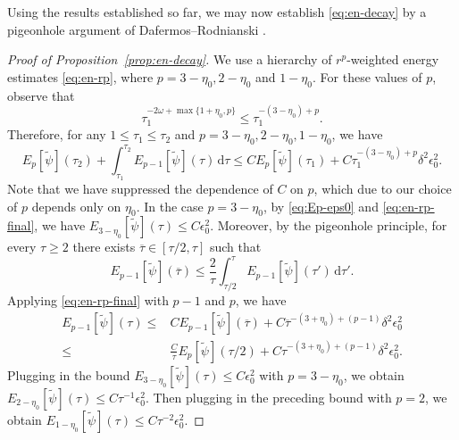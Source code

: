 \documentclass[10pt, reqno]{amsart}
\theoremstyle{definition}
\theoremstyle{remark}
\theoremstyle{conjecture}
\numberwithin{equation}{section}
\newcommand{\set}[1]{\{#1\}}
\newcommand{\ud}{\mathrm{d}}
\newcommand{\0}{\emptyset}
\newcommand{\dlt}{\delta}
\newcommand{\eps}{\epsilon}
\newcommand{\omg}{\omega}
\newcommand{\psibg}{\overline{\psi}}				%
\newcommand{\psidf}{\widetilde{\psi}}				%
\begin{document}
Using the results established so far, we may now establish \eqref{eq:en-decay} by a pigeonhole argument of Dafermos--Rodnianski \cite{DRNM}.
\begin{proof}[Proof of Proposition~\ref{prop:en-decay}]
We use a hierarchy of $r^{p}$-weighted energy estimates \eqref{eq:en-rp}, where $p = 3-\eta_{0}, 2-\eta_{0}$ and $1-\eta_{0}$. For these values of $p$, observe that
\begin{equation*}
	\tau_{1}^{-2 \omg + \max \set{1+\eta_{0}, p}} \leq \tau_{1}^{-(3 - \eta_{0}) + p}.
\end{equation*}
Therefore, for any $1 \leq \tau_{1} \leq \tau_{2}$ and $p = 3 - \eta_{0}, 2 - \eta_{0}, 1-\eta_{0}$, we have
\begin{equation} \label{eq:en-rp-final}
	E_{p}[\psidf](\tau_{2}) + \int_{\tau_{1}}^{\tau_{2}} E_{p-1}[\psidf](\tau) \, \ud \tau
	\leq C E_{p}[\psidf](\tau_{1}) + C \tau_{1}^{-(3 - \eta_{0}) + p} \dlt^{2} \eps_{0}^{2}.
\end{equation}
Note that we have suppressed the dependence of $C$ on $p$, which due to our choice of $p$ depends only on $\eta_0$.
In the case $p = 3 - \eta_{0}$, by \eqref{eq:Ep-eps0} and \eqref{eq:en-rp-final}, we have $E_{3-\eta_{0}}[\psidf](\tau) \leq C \eps_{0}^{2}$. Moreover, by the pigeonhole principle, for every $\tau \geq 2$ there exists $\overline{\tau} \in [\tau/2, \tau]$ such that
\begin{equation*}
	E_{p-1}[\psidf](\overline{\tau}) \leq \frac{2}{\tau} \int_{\tau/2}^{\tau} E_{p-1}[\psidf](\tau') \, \ud \tau'.
\end{equation*}
Applying \eqref{eq:en-rp-final} with $p-1$ and $p$, we have
\begin{align*}
	E_{p-1}[\psidf](\tau)
	\leq & C E_{p-1}[\psidf](\overline{\tau}) + C \overline{\tau}^{- (3 + \eta_{0}) + (p-1)} \dlt^{2} \eps_{0}^{2} \\
	\leq & \frac{C}{\tau} E_{p}[\psidf](\tau/2) + C \tau^{- (3 + \eta_{0}) + (p-1)} \dlt^{2} \eps_{0}^{2}.
\end{align*}
Plugging in the bound $E_{3-\eta_{0}}[\psidf](\tau) \leq C \eps_{0}^{2}$ with $p = 3 - \eta_{0}$, we obtain $E_{2-\eta_{0}}[\psidf](\tau) \leq C \tau^{-1} \eps_{0}^{2}$. Then plugging in the preceding bound with $p = 2$, we obtain $E_{1-\eta_{0}}[\psidf](\tau) \leq C \tau^{-2} \eps_{0}^{2}$. 


\end{proof}
\end{document}

